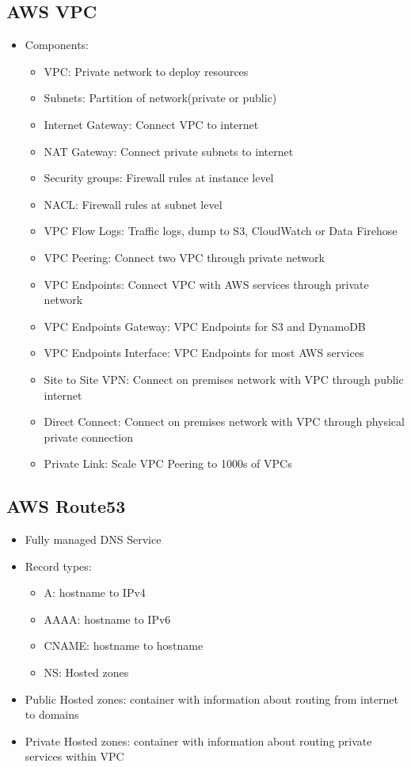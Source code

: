 \documentclass[../../main.tex]{subfiles}
\begin{document}
\subsection{AWS VPC}
\begin{itemize}
    \item Components:
    \begin{itemize}
        \item VPC: Private network to deploy resources
        \item Subnets: Partition of network(private or public)
        \item Internet Gateway: Connect VPC to internet
        \item NAT Gateway: Connect private subnets to internet
        \item Security groups: Firewall rules at instance level
        \item NACL: Firewall rules at subnet level
        \item VPC Flow Logs: Traffic logs, dump to S3, CloudWatch or Data Firehose
        \item VPC Peering: Connect two VPC through private network
        \item VPC Endpoints: Connect VPC with AWS services through private network
        \item VPC Endpoints Gateway: VPC Endpoints for S3 and DynamoDB
        \item VPC Endpoints Interface: VPC Endpoints for most AWS services
        \item Site to Site VPN: Connect on premises network with VPC through public internet
        \item Direct Connect: Connect on premises network with VPC through physical private connection
        \item Private Link: Scale VPC Peering to 1000s of VPCs
    \end{itemize}
\end{itemize}

\subsection{AWS Route53}
\begin{itemize}
    \item Fully managed DNS Service
    \item Record types:
    \begin{itemize}
        \item A: hostname to IPv4
        \item AAAA: hostname to IPv6
        \item CNAME: hostname to hostname
        \item NS: Hosted zones
    \end{itemize}
    \item Public Hosted zones: container with information about routing from internet to domains
    \item Private Hosted zones: container with information about routing private services within VPC
\end{itemize}
\end{document}
